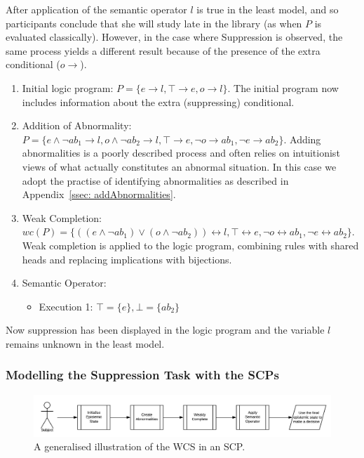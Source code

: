 \documentclass{article}
\begin{document}
After application of the semantic operator $l$ is true in the least model, and so participants conclude that she will study late in the library (as when $P$ is evaluated classically). However, in the case where Suppression is observed, the same process yields a different result because of the presence of the extra conditional ($o\rightarrow$).
\begin{enumerate}
\item Initial logic program: $P = \{e \rightarrow l, \top \rightarrow e, o \rightarrow l \}$. The initial program now includes information about the extra (suppressing) conditional.
\item Addition of Abnormality: $P = \{e \land \lnot ab_1 \rightarrow l, o \land \lnot ab_2 \rightarrow l, \top \rightarrow e, \lnot o \rightarrow ab_1, \lnot e \rightarrow ab_2 \}$. Adding abnormalities is a poorly described process and often relies on intuitionist views of what actually constitutes an abnormal situation. In this case we adopt the practise of identifying abnormalities as described in Appendix~\ref{ssec: addAbnormalities}.
\item Weak Completion: $wc(P) = \{((e \land \lnot ab_1) \lor (o \land \lnot ab_2)) \leftrightarrow l, \top \leftrightarrow e, \lnot o \leftrightarrow ab_1, \lnot e \leftrightarrow ab_2 \}$. Weak completion is applied to the logic program, combining rules with shared heads and replacing implications with bijections.
\item Semantic Operator:
\begin{itemize}
\item Execution 1: $\top=\{e\}, \bot=\{ab_2\}$
\end{itemize}
\end{enumerate}

Now suppression has been displayed in the logic program and the variable $l$ remains unknown in the least model.

\subsubsection{Modelling the Suppression Task with the SCPs}
\begin{figure}
\begin{center}
 \centering \includegraphics[scale=0.65]{suppressionSCP_overview}
\caption{A generalised illustration of the WCS in an SCP. }
\label {fig:supoverview}
\end{center}
\end{figure}
\end{document}
